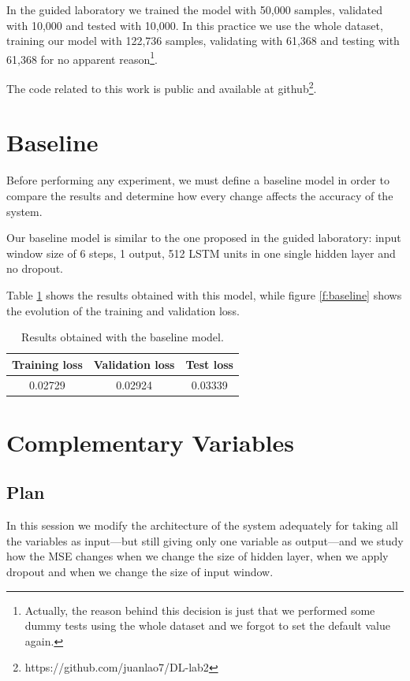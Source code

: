 \documentclass[]{article}
\begin{document}
	In the guided laboratory we trained the model with 50,000 samples, validated with 10,000 and tested with 10,000. In this practice we use the whole dataset, training our model with 122,736 samples, validating with 61,368 and testing with 61,368 for no apparent reason\footnote{Actually, the reason behind this decision is just that we performed some dummy tests using the whole dataset and we forgot to set the default value again.}.
	
	The code related to this work is public and available at github\footnote{https://github.com/juanlao7/DL-lab2}.
	
	\section{Baseline}
	
	Before performing any experiment, we must define a baseline model in order to compare the results and determine how every change affects the accuracy of the system.
	
	Our baseline model is similar to the one proposed in the guided laboratory: input window size of 6 steps, 1 output, 512 LSTM units in one single hidden layer and no dropout.
	
	Table \ref{t:baseline} shows the results obtained with this model, while figure \ref{f:baseline} shows the evolution of the training and validation loss.
	
	\begin{table}[H]
		\centering
		\begin{tabular}{@{}ccc@{}}
			\toprule
			Training loss & Validation loss & Test loss \\ \midrule
			0.02729       & 0.02924         & 0.03339   \\ \bottomrule
		\end{tabular}
		\caption{Results obtained with the baseline model.}
		\label{t:baseline}
	\end{table}
	
	\section{Complementary Variables}
	
	\subsection{Plan}
	
	In this session we modify the architecture of the system adequately for taking all the variables as input---but still giving only one variable as output---and we study how the MSE changes when we change the size of hidden layer, when we apply dropout and when we change the size of input window.
	
\end{document}
